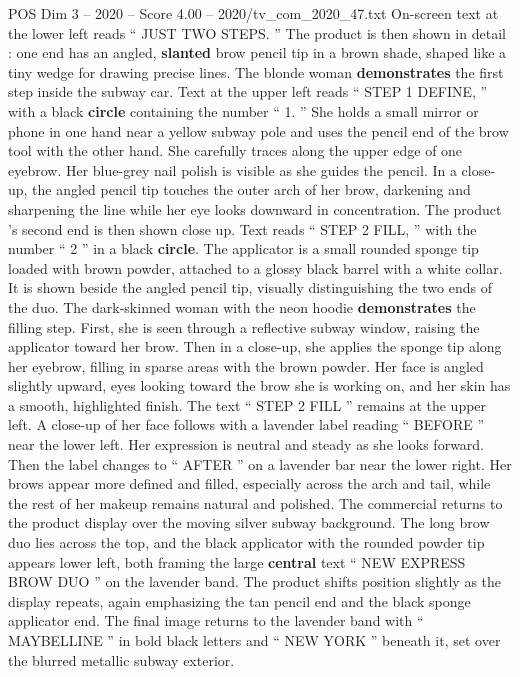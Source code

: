 \begin{textsample}{POS Dim 3 – 2020 – Score 4.00 – 2020/tv\_com\_2020\_47.txt}
On-screen text at the lower left reads “ JUST TWO STEPS. ” The product is then shown in detail : one end has an angled, \textbf{slanted} brow pencil tip in a brown shade, shaped like a tiny wedge for drawing precise lines.
The blonde woman \textbf{demonstrates} the first step inside the subway car.
Text at the upper left reads “ STEP 1 DEFINE, ” with a black \textbf{circle} containing the number “ 1. ” She holds a small mirror or phone in one hand near a yellow subway pole and uses the pencil end of the brow tool with the other hand.
She carefully traces along the upper edge of one eyebrow.
Her blue-grey nail polish is visible as she guides the pencil.
In a close-up, the angled pencil tip touches the outer arch of her brow, darkening and sharpening the line while her eye looks downward in concentration.
The product ’s second end is then shown close up.
Text reads “ STEP 2 FILL, ” with the number “ 2 ” in a black \textbf{circle}.
The applicator is a small rounded sponge tip loaded with brown powder, attached to a glossy black barrel with a white collar.
It is shown beside the angled pencil tip, visually distinguishing the two ends of the duo.
The dark-skinned woman with the neon hoodie \textbf{demonstrates} the filling step.
First, she is seen through a reflective subway window, raising the applicator toward her brow.
Then in a close-up, she applies the sponge tip along her eyebrow, filling in sparse areas with the brown powder.
Her face is angled slightly upward, eyes looking toward the brow she is working on, and her skin has a smooth, highlighted finish.
The text “ STEP 2 FILL ” remains at the upper left.
A close-up of her face follows with a lavender label reading “ BEFORE ” near the lower left.
Her expression is neutral and steady as she looks forward.
Then the label changes to “ AFTER ” on a lavender bar near the lower right.
Her brows appear more defined and filled, especially across the arch and tail, while the rest of her makeup remains natural and polished.
The commercial returns to the product display over the moving silver subway background.
The long brow duo lies across the top, and the black applicator with the rounded powder tip appears lower left, both framing the large \textbf{central} text “ NEW EXPRESS BROW DUO ” on the lavender band.
The product shifts position slightly as the display repeats, again emphasizing the tan pencil end and the black sponge applicator end.
The final image returns to the lavender band with “ MAYBELLINE ” in bold black letters and “ NEW YORK ” beneath it, set over the blurred metallic subway exterior.

\end{textsample}
